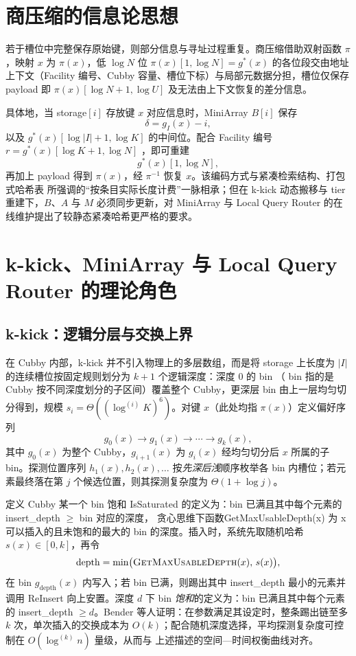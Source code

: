 \section{商压缩的信息论思想}

若于槽位中完整保存原始键，则部分信息与寻址过程重复。商压缩借助双射函数 \(\pi\)，映射 \(x\) 为 \(\pi(x)\)，低 \(\log N\) 位 \(\pi(x)[1,\log N]=g^\ast(x)\) 的各位段交由地址上下文（Facility 编号、Cubby 容量、槽位下标）与局部元数据分担，槽位仅保存 payload 即 \(\pi(x)[\log N+1,\log U]\) 及无法由上下文恢复的差分信息。

具体地，当 storage\([i]\) 存放键 \(x\) 对应信息时，MiniArray \(B[i]\) 保存
\[
  \delta=g_I(x)-i,
\]
以及 \(g^\ast(x)[\log|I|+1,\log K]\) 的中间位。配合 Facility 编号 \(r=g^\ast(x)[\log K+1,\log N]\) ，即可重建
\[
  g^\ast(x)[1,\log N],
\]
再加上 payload 得到 \(\pi(x)\)，经 \(\pi^{-1}\) 恢复 \(x\)。该编码方式与紧凑检索结构\cite{pagh2008retrieval,lehmann2026mphsurvey}、打包式哈希表\cite{kurpicz2023pachash,hermann2024phobic} 所强调的“按条目实际长度计费”一脉相承；但在 k-kick 动态搬移与 tier 重建下，\(B\)、\(A\) 与 \(M\) 必须同步更新，对 MiniArray 与 Local Query Router 的在线维护提出了较静态紧凑哈希更严格的要求\cite{bender2022otsh,kuszmaul2024filters}。

\section{k-kick、MiniArray 与 Local Query Router 的理论角色}

\subsection{k-kick：逻辑分层与交换上界}

在 Cubby 内部，k-kick 并不引入物理上的多层数组，而是将 storage 上长度为 \(|I|\) 的连续槽位按固定规则划分为 \(k+1\) 个逻辑深度：深度 0 的 bin （ bin 指的是Cubby 按不同深度划分的子区间）覆盖整个 Cubby，更深层 bin 由上一层均匀切分得到，规模 \(s_i=\Theta((\log^{(i)}K)^6)\)。对键 \(x\)（此处均指 \(\pi(x)\)）定义偏好序列
\[
  g_0(x)\rightarrow g_1(x)\rightarrow\cdots\rightarrow g_k(x),
\]
其中 \(g_0(x)\) 为整个 Cubby，\(g_{i+1}(x)\) 为 \(g_i(x)\) 经均匀切分后 \(x\) 所属的子 bin。探测位置序列 \(h_1(x),h_2(x),\ldots\) 按\emph{先深后浅}顺序枚举各 bin 内槽位；若元素最终落在第 \(j\) 个候选位置，则其探测复杂度为 \(\Theta(1+\log j)\)。

定义 Cubby 某一个 bin 饱和 IsSaturated 的定义为：bin 已满且其中每个元素的 insert\_depth \(\ge \) bin 对应的深度， 贪心思维下函数GetMaxUsableDepth(x) 为 x 可以插入的且未饱和的最大的 bin 的深度。插入时，系统先取随机哈希 \(s(x)\in[0,k]\)，再令
\[
  \mathrm{depth}=\min\bigl(\Call{GetMaxUsableDepth}{x},\,s(x)\bigr),
\]
在 bin \(g_{\mathrm{depth}}(x)\) 内写入；若 bin 已满，则踢出其中 insert\_depth 最小的元素并调用 ReInsert 向上安置。深度 \(d\) 下 bin \emph{饱和}的定义为：bin 已满且其中每个元素的 insert\_depth \(\ge d\)。Bender 等人\cite{bender2022otsh}证明：在参数满足其设定时，整条踢出链至多 \(k\) 次，单次插入的交换成本为 \(O(k)\)；配合随机深度选择，平均探测复杂度可控制在 \(O(\log^{(k)}n)\) 量级，从而与 上述描述的空间—时间权衡曲线对齐\cite{pagh2004cuckoo,lehmann2023sichash,pagh2004linear}。

